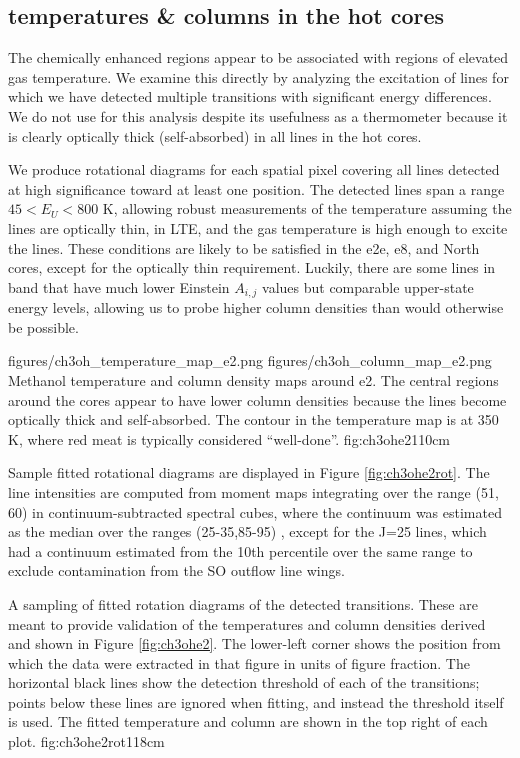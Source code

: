 \documentclass{aa}
\begin{document}
\subsection{\methanol temperatures \& columns in the hot cores}
\label{sec:ch3ohtem}
\label{sec:methanol}
The  chemically enhanced regions appear to be associated with regions of
elevated gas temperature.  We examine this directly by analyzing
the excitation of lines for which we have detected multiple transitions with
significant energy differences.  We do not use \formaldehyde  for this analysis 
despite its usefulness as a thermometer
because it is clearly optically thick (self-absorbed) in all lines in the
hot cores.

We produce rotational diagrams for each spatial pixel covering all \methanol lines
detected at high significance toward at least one position.  The detected lines
span a range $45 < E_U < 800$ K, allowing robust measurements of the temperature
assuming the lines are optically thin, in LTE, and the gas temperature is high
enough to excite the lines.  These conditions are likely to be satisfied in the
e2e, e8, and North cores, except for the optically thin requirement.  Luckily,
there are some lines in band that have much lower Einstein $A_{i,j}$ values
but comparable upper-state energy levels, allowing us to probe higher column
densities than would otherwise be possible.

\FigureTwo
{figures/ch3oh_temperature_map_e2.png}
{figures/ch3oh_column_map_e2.png}
{Methanol temperature and column density maps around e2.  The central regions around
the cores appear to have lower column densities because the lines become
optically thick and self-absorbed.  The contour in the temperature map is at
350 K, where red meat is typically considered ``well-done''.}
{fig:ch3ohe2}{1}{10cm}

Sample fitted rotational diagrams are displayed in Figure \ref{fig:ch3ohe2rot}.
The line intensities are computed from moment maps integrating over the range
(51, 60) \kms in continuum-subtracted spectral cubes, where the continuum
was estimated as the median over the ranges (25-35,85-95) \kms, except
for the J=25 lines, which had a continuum estimated from the 10th percentile
over the same range to exclude contamination from the SO outflow line wings.

{A sampling of fitted rotation diagrams of the detected \methanol transitions.
These are meant to provide validation of the temperatures and column densities
derived and shown in Figure \ref{fig:ch3ohe2}.  The lower-left corner shows
the position from which the data were extracted in that figure in units of
figure fraction.  The horizontal black lines show the detection threshold of each
of the transitions; points below these lines are ignored when fitting, and instead
the threshold itself is used.  The fitted temperature and
column are shown in the top right of each plot.
}{fig:ch3ohe2rot}{1}{18cm}
\end{document}

